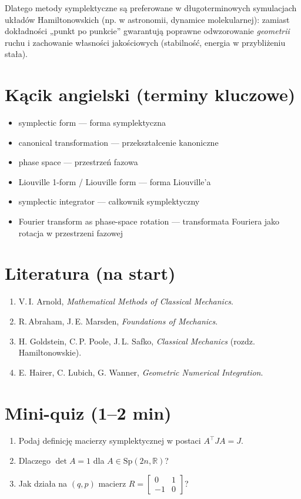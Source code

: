 \documentclass[12pt]{article}
\newcommand{\R}{\mathbb{R}}
\newcommand{\Sp}{\mathrm{Sp}}
\begin{document}
\noindent
Dlatego metody symplektyczne są preferowane w długoterminowych symulacjach układów Hamiltonowskich (np. w astronomii, dynamice molekularnej): zamiast dokładności „punkt po punkcie” gwarantują poprawne odwzorowanie \emph{geometrii} ruchu i zachowanie własności jakościowych (stabilność, energia w przybliżeniu stała).

\section*{Kącik angielski (terminy kluczowe)}
\begin{itemize}[label=$\triangleright$]
\item symplectic form — forma symplektyczna
\item canonical transformation — przekształcenie kanoniczne
\item phase space — przestrzeń fazowa
\item Liouville 1-form / Liouville form — forma Liouville’a
\item symplectic integrator — całkownik symplektyczny
\item Fourier transform as phase-space rotation — transformata Fouriera jako rotacja w przestrzeni fazowej
\end{itemize}

\section*{Literatura (na start)}
\begin{enumerate}
\item V.\,I. Arnold, \emph{Mathematical Methods of Classical Mechanics}.
\item R.\,Abraham, J.\,E. Marsden, \emph{Foundations of Mechanics}.
\item H. Goldstein, C.\,P. Poole, J.\,L. Safko, \emph{Classical Mechanics} (rozdz. Hamiltonowskie).
\item E. Hairer, C. Lubich, G. Wanner, \emph{Geometric Numerical Integration}.
\end{enumerate}

\section*{Mini-quiz (1–2 min)}
\begin{enumerate}[label=\arabic*.]
\item Podaj definicję macierzy symplektycznej w postaci $A^\top J A=J$.
\item Dlaczego $\det A=1$ dla $A\in\Sp(2n,\R)$?
\item Jak działa na $(q,p)$ macierz $R=\begin{bmatrix}0&1\\ -1&0\end{bmatrix}$?
\end{enumerate}
\end{document}

